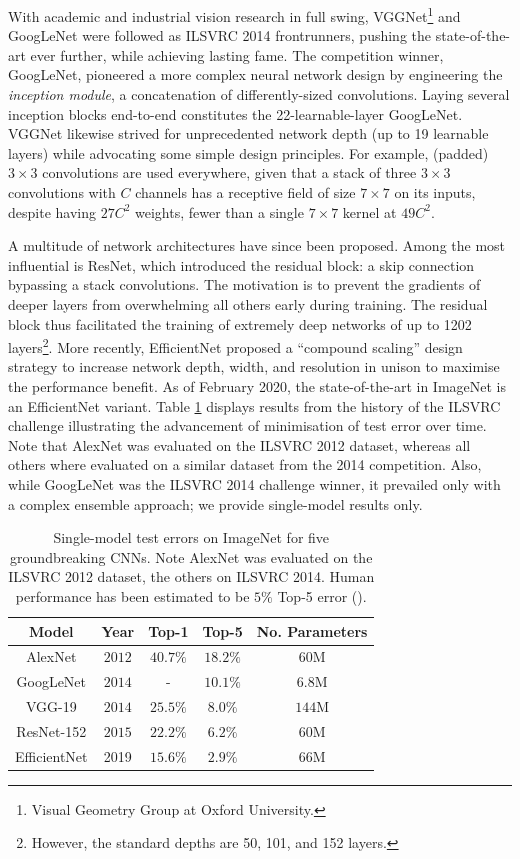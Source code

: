 With academic and industrial vision research in full swing, VGGNet\footnote{Visual Geometry Group at Oxford University.} and GoogLeNet were followed as ILSVRC 2014 frontrunners, pushing the state-of-the-art ever further, while achieving lasting fame. The competition winner, GoogLeNet, pioneered a more complex neural network design by engineering the \emph{inception module}, a concatenation of differently-sized convolutions. Laying several inception blocks end-to-end constitutes the 22-learnable-layer GoogLeNet. VGGNet likewise strived for unprecedented network depth (up to 19 learnable layers) while advocating some simple design principles. For example, (padded) $3\times 3$ convolutions are used everywhere, given that a stack of three $3 \times 3$ convolutions with $C$ channels has a receptive field of size $7 \times 7$ on its inputs, despite having $27C^2$ weights, fewer than a single $7 \times 7$ kernel at $49C^2$.

A multitude of network architectures have since been proposed. Among the most influential is ResNet, which introduced the residual block: a skip connection bypassing a stack convolutions. The motivation is to prevent the gradients of deeper layers from overwhelming all others early during training. The residual block thus facilitated the training of extremely deep networks of up to 1202 layers\footnote{However, the standard depths are 50, 101, and 152 layers.}. More recently, EfficientNet proposed a ``compound scaling'' design strategy to increase network depth, width, and resolution in unison to maximise the performance benefit. As of February 2020, the state-of-the-art in ImageNet is an EfficientNet variant. Table \ref{table:convnets} displays results from the history of the ILSVRC challenge illustrating the advancement of minimisation of test error over time. Note that AlexNet was evaluated on the ILSVRC 2012 dataset, whereas all others where evaluated on a similar dataset from the 2014 competition. Also, while GoogLeNet was the ILSVRC 2014 challenge winner, it prevailed only with a complex ensemble approach; we provide single-model results only. 

\begin{table}
\centering
\begin{tabular}{|c|c|c|c|c|} 
\hline
 Model & Year &  Top-1 & Top-5 & No. Parameters \\ 
 \hline
 AlexNet & $2012$ & $40.7\%$ & $18.2\%$ & $60$M \\
 GoogLeNet & $2014$ & - & $10.1\%$ & $6.8$M\\
 VGG-19 & $2014$ & $25.5\%$ & $8.0\%$ & $144$M \\
 ResNet-152 & $2015$ & $22.2\%$ & $6.2\%$ & $60$M \\
 EfficientNet & 2019 & $15.6\%$ & $2.9\%$ & $66$M \\
 \hline
\end{tabular}
\caption{Single-model test errors on ImageNet for five groundbreaking CNNs. Note AlexNet was evaluated on the ILSVRC 2012 dataset, the others on ILSVRC 2014. Human performance has been estimated to be $5\%$ Top-5 error (\cite{karpathy2014learned}).}
\label{table:convnets}
\end{table}

